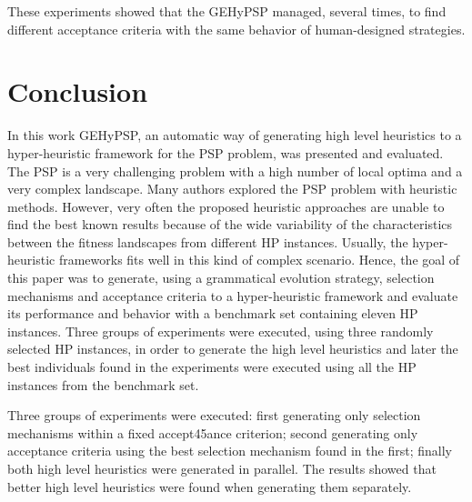 \documentclass[conference]{IEEEtran}
\begin{document}
These experiments showed that the GEHyPSP managed, several times, to find different acceptance criteria with the same behavior of human-designed strategies. 





%
%
%


\section{Conclusion}
\label{sec:conclusion}
In this work  GEHyPSP, an automatic way of generating high level heuristics to a hyper-heuristic framework for the PSP problem, was presented and evaluated. The PSP is a very challenging problem  with a high number of local optima and a very complex landscape. Many authors explored the PSP problem with heuristic methods. 
However, very often the proposed heuristic approaches are unable to find the best known results because of the wide variability of the characteristics between the fitness landscapes from different HP instances. Usually, the hyper-heuristic frameworks fits well in this kind of complex scenario. Hence, the goal of this paper was to generate, using a grammatical evolution strategy, selection mechanisms and acceptance criteria to a hyper-heuristic framework and evaluate its performance and behavior with a benchmark set containing eleven HP instances. Three groups of experiments were executed, using three randomly selected HP instances, in order to generate the high level heuristics and later the best individuals found in the experiments were executed using all the HP instances from the benchmark set. 

Three groups of experiments were executed: first generating only selection mechanisms within a fixed accept45ance criterion; second generating only acceptance criteria using the best selection mechanism found in the first; finally both high level heuristics were generated in parallel. The results showed that better high level heuristics were found when generating them separately. 
\end{document}
